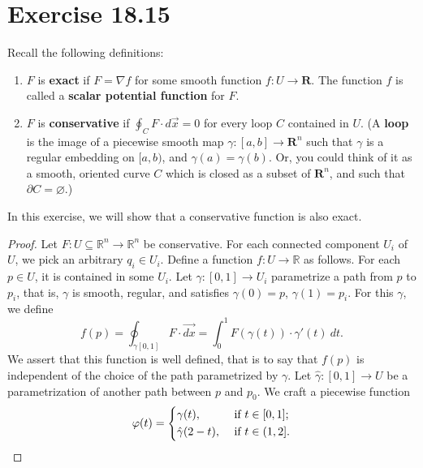 \documentclass{article}
\newcommand{\R}{\mathbf{R}}
\theoremstyle{plain} %
\numberwithin{thm}{section} %
\theoremstyle{definition}
\begin{document}
    \section*{Exercise 18.15}
    Recall the following definitions:
    \begin{enumerate}[label=(\alph*)]
        \item $F$ is \textbf{exact} if $F=\nabla f$ for some smooth function $f:U\rightarrow \R$. The function $f$ is called a \textbf{scalar potential function} for $F$.
        \item $F$ is \textbf{conservative} if $\displaystyle \oint_CF \cdot d\vec{x}=0$ for every loop $C$ contained in $U$. (A \textbf{loop} is the image of a piecewise smooth map $\gamma:[a,b]\rightarrow \R^n$ such that $\gamma$ is a regular embedding on $[a,b)$, and $\gamma(a)=\gamma(b)$. Or, you could think of it as a smooth, oriented curve $C$ which is closed as a subset of $\R^n$, and such that $\partial C = \varnothing$.)
    \end{enumerate}
    In this exercise, we will show that a conservative function is also exact.
    \begin{proof}
        Let \(F: U \subseteq \mathbb{R}^n \to \mathbb{R}^n\) be conservative. For each connected component \(U_i\) of \(U\), we pick an arbitrary \(q_i \in U_i\). Define a function \(f: U \to \mathbb{R}\) as follows. For each \(p \in U\), it is contained in some \(U_i\). Let \(\gamma : [0,1] \to U_i\) parametrize a path from \(p\) to \(p_i\), that is, \(\gamma\) is smooth, regular, and satisfies \(\gamma (0) = p\), \(\gamma (1) = p_i\). For this \(\gamma\), we define
        \[
            f(p) = \oint _{\gamma [0,1]} F \cdot \vec{dx} = \int _0^1 F (\gamma (t))\cdot \gamma '(t)\ dt.
        \]
        We assert that this function is well defined, that is to say that \(f(p)\) is independent of the choice of the path parametrized by \(\gamma\). Let \(\hat{\gamma}: [0,1] \to U\) be a parametrization of another path between \(p\) and \(p_0\). We craft a piecewise function
        \[
            \varphi (t) = \begin{dcases}
                \gamma(t), &\text{ if } t \in [0,1] ;\\
                \hat{\gamma}(2 - t), &\text{ if } t \in (1, 2] .\\
            \end{dcases}
        \]
    \end{proof}
\end{document}
